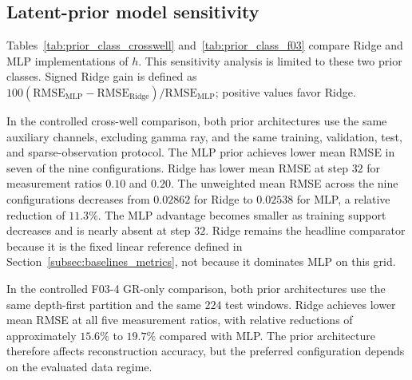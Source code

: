\subsection{Latent-prior model sensitivity}
\label{subsec:latent_prior_sensitivity}

Tables~\ref{tab:prior_class_crosswell} and~\ref{tab:prior_class_f03} compare
Ridge and MLP implementations of $h$. This sensitivity analysis is limited to
these two prior classes. Signed Ridge gain is defined as
$100(\mathrm{RMSE}_{\mathrm{MLP}}-\mathrm{RMSE}_{\mathrm{Ridge}})
 /\mathrm{RMSE}_{\mathrm{MLP}}$; positive values favor Ridge.

In the controlled cross-well comparison, both prior architectures use the
same auxiliary channels, excluding gamma ray, and the same training,
validation, test, and sparse-observation protocol. The MLP prior achieves
lower mean RMSE in seven of the nine configurations. Ridge has lower mean
RMSE at step $32$ for measurement ratios $0.10$ and $0.20$. The unweighted
mean RMSE across the nine configurations decreases from $0.02862$ for Ridge
to $0.02538$ for MLP, a relative reduction of $11.3\%$. The MLP advantage
becomes smaller as training support decreases and is nearly absent at step
$32$. Ridge remains the headline comparator because it is the fixed linear
reference defined in Section~\ref{subsec:baselines_metrics}, not because it
dominates MLP on this grid.

\begin{table}[t]
    \centering
    \caption{Cross-well $V_c$ latent-prior sensitivity. Positive signed Ridge
    gain favors Ridge, whereas negative values favor MLP.}
    \label{tab:prior_class_crosswell}
    \small
\end{table}

In the controlled F03-4 GR-only comparison, both prior architectures use the
same depth-first partition and the same $224$ test windows. Ridge achieves
lower mean RMSE at all five measurement ratios, with relative reductions of
approximately $15.6\%$ to $19.7\%$ compared with MLP. The prior architecture
therefore affects reconstruction accuracy, but the preferred configuration
depends on the evaluated data regime.

\begin{table}[t]
    \centering
    \caption{Single-well F03-4 GR-only latent-prior sensitivity. Signed Ridge
    gain follows the definition used in
    Table~\ref{tab:prior_class_crosswell}.}
    \label{tab:prior_class_f03}
    \small
\end{table}

